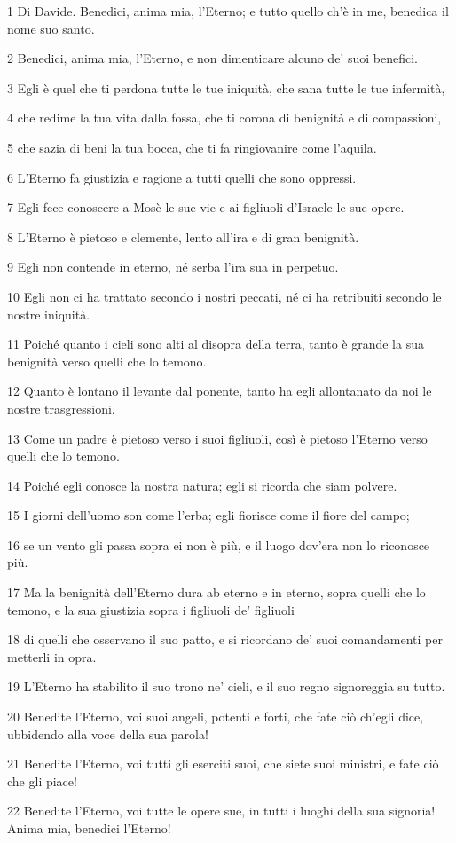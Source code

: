\par 1 Di Davide. Benedici, anima mia, l'Eterno; e tutto quello ch'è in me, benedica il nome suo santo.
\par 2 Benedici, anima mia, l'Eterno, e non dimenticare alcuno de' suoi benefici.
\par 3 Egli è quel che ti perdona tutte le tue iniquità, che sana tutte le tue infermità,
\par 4 che redime la tua vita dalla fossa, che ti corona di benignità e di compassioni,
\par 5 che sazia di beni la tua bocca, che ti fa ringiovanire come l'aquila.
\par 6 L'Eterno fa giustizia e ragione a tutti quelli che sono oppressi.
\par 7 Egli fece conoscere a Mosè le sue vie e ai figliuoli d'Israele le sue opere.
\par 8 L'Eterno è pietoso e clemente, lento all'ira e di gran benignità.
\par 9 Egli non contende in eterno, né serba l'ira sua in perpetuo.
\par 10 Egli non ci ha trattato secondo i nostri peccati, né ci ha retribuiti secondo le nostre iniquità.
\par 11 Poiché quanto i cieli sono alti al disopra della terra, tanto è grande la sua benignità verso quelli che lo temono.
\par 12 Quanto è lontano il levante dal ponente, tanto ha egli allontanato da noi le nostre trasgressioni.
\par 13 Come un padre è pietoso verso i suoi figliuoli, così è pietoso l'Eterno verso quelli che lo temono.
\par 14 Poiché egli conosce la nostra natura; egli si ricorda che siam polvere.
\par 15 I giorni dell'uomo son come l'erba; egli fiorisce come il fiore del campo;
\par 16 se un vento gli passa sopra ei non è più, e il luogo dov'era non lo riconosce più.
\par 17 Ma la benignità dell'Eterno dura ab eterno e in eterno, sopra quelli che lo temono, e la sua giustizia sopra i figliuoli de' figliuoli
\par 18 di quelli che osservano il suo patto, e si ricordano de' suoi comandamenti per metterli in opra.
\par 19 L'Eterno ha stabilito il suo trono ne' cieli, e il suo regno signoreggia su tutto.
\par 20 Benedite l'Eterno, voi suoi angeli, potenti e forti, che fate ciò ch'egli dice, ubbidendo alla voce della sua parola!
\par 21 Benedite l'Eterno, voi tutti gli eserciti suoi, che siete suoi ministri, e fate ciò che gli piace!
\par 22 Benedite l'Eterno, voi tutte le opere sue, in tutti i luoghi della sua signoria! Anima mia, benedici l'Eterno!


